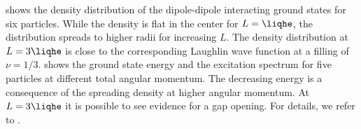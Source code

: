 
 shows the density distribution of the dipole-dipole interacting ground states for six particles. While the density is flat in the center for $L=\liqhe$, the distribution spreads to higher radii for increasing $L$. The density distribution at $L=3\liqhe$ is close to the corresponding Laughlin wave function at a filling of $\nu=1/3$.  shows the ground state energy and the excitation spectrum for five particles at different total angular momentum. The decreasing energy is a consequence of the spreading density at higher angular momentum. At $L=3\liqhe$ it is possible to see evidence for a gap opening. For details, we refer to .
